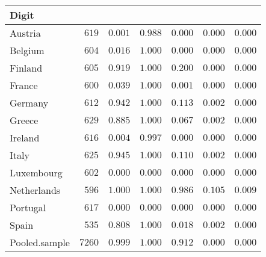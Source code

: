 \begin{table}[!tbp]
\begin{center}
\begin{tabular}{lrrrrrr}
\hline\hline
\multicolumn{1}{l}{Digit}&\multicolumn{1}{c}{}&\multicolumn{1}{c}{}&\multicolumn{1}{c}{}&\multicolumn{1}{c}{}&\multicolumn{1}{c}{}&\multicolumn{1}{c}{}\tabularnewline
\hline
Austria&$ 619$&$0.001$&$0.988$&$0.000$&$0.000$&$0.000$\tabularnewline
Belgium&$ 604$&$0.016$&$1.000$&$0.000$&$0.000$&$0.000$\tabularnewline
Finland&$ 605$&$0.919$&$1.000$&$0.200$&$0.000$&$0.000$\tabularnewline
France&$ 600$&$0.039$&$1.000$&$0.001$&$0.000$&$0.000$\tabularnewline
Germany&$ 612$&$0.942$&$1.000$&$0.113$&$0.002$&$0.000$\tabularnewline
Greece&$ 629$&$0.885$&$1.000$&$0.067$&$0.002$&$0.000$\tabularnewline
Ireland&$ 616$&$0.004$&$0.997$&$0.000$&$0.000$&$0.000$\tabularnewline
Italy&$ 625$&$0.945$&$1.000$&$0.110$&$0.002$&$0.000$\tabularnewline
Luxembourg&$ 602$&$0.000$&$0.000$&$0.000$&$0.000$&$0.000$\tabularnewline
Netherlands&$ 596$&$1.000$&$1.000$&$0.986$&$0.105$&$0.009$\tabularnewline
Portugal&$ 617$&$0.000$&$0.000$&$0.000$&$0.000$&$0.000$\tabularnewline
Spain&$ 535$&$0.808$&$1.000$&$0.018$&$0.002$&$0.000$\tabularnewline
Pooled.sample&$7260$&$0.999$&$1.000$&$0.912$&$0.000$&$0.000$\tabularnewline
\hline
\end{tabular}\end{center}
\end{table}
